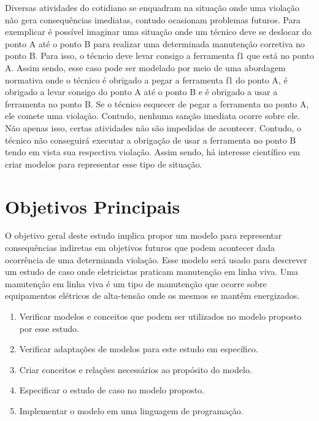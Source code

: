 \documentclass[a0,portrait]{a0poster}
\begin{document}
\begin{multicols}{2}
Diversas atividades do cotidiano se enquadram na situação onde uma violação não gera consequências
imediatas, contudo ocasionam problemas futuros. Para exemplicar é possível imaginar uma situação
onde um técnico deve se deslocar do ponto A até o ponto B para realizar uma determinada manutenção
corretiva no ponto B. Para isso, o técncio deve levar consigo a ferramenta f1 que está no ponto A. 
Assim sendo, esse caso pode ser modelado por meio de uma abordagem normativa onde o técnico é
obrigado a pegar a ferramenta f1 do ponto A, é obrigado a levar consigo do ponto A até o ponto B e
é obrigado a usar a ferramenta no ponto B. Se o técnico esquecer de pegar a ferramenta no ponto A,
ele comete uma violação. Contudo, nenhuma sanção imediata ocorre sobre ele. Não apenas isso, certas
atividades não são impedidas de acontecer. Contudo, o técnico não conseguirá executar a obrigação de 
usar a ferramenta no ponto B tendo em vista sua respectiva violação. Assim sendo, há interesse 
científico em criar modelos para representar esse tipo de situação.


\color{} %

\section*{Objetivos Principais}

O objetivo geral deste estudo implica propor um modelo para representar consequências indiretas em 
objetivos futuros que podem acontecer dada ocorrência de uma determianda violação. Esse modelo 
será usado para descrever um estudo de caso onde eletricistas praticam manutenção em linha viva.
Uma manutenção em linha viva é um tipo de manutenção que ocorre sobre equipamentos elétricos de alta-tensão 
onde os mesmos se mantêm energizados. 

\begin{enumerate}
\item Verificar modelos e conceitos que podem ser utilizados no modelo proposto por esse estudo.
\item Verificar adaptações de modelos para este estudo em específico.
\item Criar conceitos e relações necessários ao propósito do modelo. 
\item Especificar o estudo de caso no modelo proposto.
\item Implementar o modelo em uma linguagem de programação.
\end{enumerate}




\end{multicols}
\end{document}
